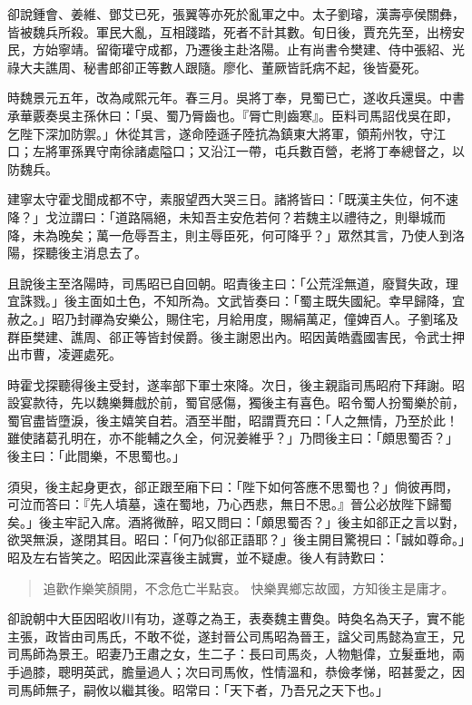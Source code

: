 卻說鍾會、姜維、鄧艾已死，張翼等亦死於亂軍之中。太子劉璿，漢壽亭侯關彝，皆被魏兵所殺。軍民大亂，互相踐踏，死者不計其數。旬日後，賈充先至，出榜安民，方始寧靖。留衛瓘守成都，乃遷後主赴洛陽。止有尚書令樊建、侍中張紹、光祿大夫譙周、秘書郎卻正等數人跟隨。廖化、董厥皆託病不起，後皆憂死。

時魏景元五年，改為咸熙元年。春三月。吳將丁奉，見蜀已亡，遂收兵還吳。中書承華覈奏吳主孫休曰：「吳、蜀乃脣齒也。『脣亡則齒寒』。臣料司馬詔伐吳在即，乞陛下深加防禦。」休從其言，遂命陸遜子陸抗為鎮東大將軍，領荊州牧，守江口；左將軍孫異守南徐諸處隘口；又沿江一帶，屯兵數百營，老將丁奉總督之，以防魏兵。

建寧太守霍戈聞成都不守，素服望西大哭三日。諸將皆曰：「既漢主失位，何不速降？」戈泣謂曰：「道路隔絕，未知吾主安危若何？若魏主以禮待之，則舉城而降，未為晚矣；萬一危辱吾主，則主辱臣死，何可降乎？」眾然其言，乃使人到洛陽，探聽後主消息去了。

且說後主至洛陽時，司馬昭已自回朝。昭責後主曰：「公荒淫無道，廢賢失政，理宜誅戮。」後主面如土色，不知所為。文武皆奏曰：「蜀主既失國紀。幸早歸降，宜赦之。」昭乃封禪為安樂公，賜住宅，月給用度，賜絹萬疋，僮婢百人。子劉瑤及群臣樊建、譙周、郤正等皆封侯爵。後主謝恩出內。昭因黃皓蠹國害民，令武士押出市曹，凌遲處死。

時霍戈探聽得後主受封，遂率部下軍士來降。次日，後主親詣司馬昭府下拜謝。昭設宴款待，先以魏樂舞戲於前，蜀官感傷，獨後主有喜色。昭令蜀人扮蜀樂於前，蜀官盡皆墮淚，後主嬉笑自若。酒至半酣，昭謂賈充曰：「人之無情，乃至於此！雖使諸葛孔明在，亦不能輔之久全，何況姜維乎？」乃問後主曰：「頗思蜀否？」後主曰：「此間樂，不思蜀也。」

須臾，後主起身更衣，郤正跟至廂下曰：「陛下如何答應不思蜀也？」倘彼再問，可泣而答曰：『先人墳墓，遠在蜀地，乃心西悲，無日不思。』晉公必放陛下歸蜀矣。」後主牢記入席。酒將微醉，昭又問曰：「頗思蜀否？」後主如郤正之言以對，欲哭無淚，遂閉其目。昭曰：「何乃似郤正語耶？」後主開目驚視曰：「誠如尊命。」昭及左右皆笑之。昭因此深喜後主誠實，並不疑慮。後人有詩歎曰：

\begin{quote}
追歡作樂笑顏開，不念危亡半點哀。
快樂異鄉忘故國，方知後主是庸才。
\end{quote}

卻說朝中大臣因昭收川有功，遂尊之為王，表奏魏主曹奐。時奐名為天子，實不能主張，政皆由司馬氏，不敢不從，遂封晉公司馬昭為晉王，諡父司馬懿為宣王，兄司馬師為景王。昭妻乃王肅之女，生二子：長曰司馬炎，人物魁偉，立髮垂地，兩手過膝，聰明英武，膽量過人；次曰司馬攸，性情溫和，恭儉孝悌，昭甚愛之，因司馬師無子，嗣攸以繼其後。昭常曰：「天下者，乃吾兄之天下也。」

